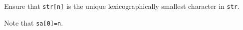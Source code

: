 Ensure that \texttt{str[n]} is the unique lexicographically smallest character in \texttt{str}.

Note that \texttt{sa[0]=n}.



